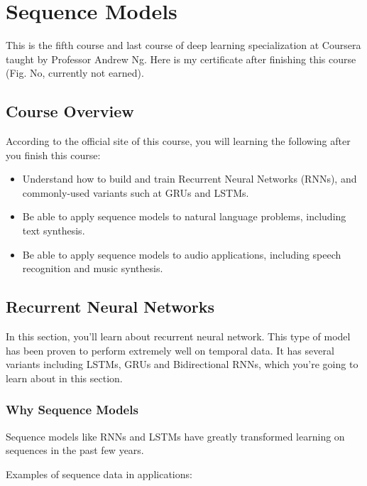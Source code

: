 \newpage
\section{Sequence Models}
This is the fifth course and last course of deep learning specialization at Coursera taught by Professor Andrew Ng. Here is my certificate after finishing this course (Fig. No, currently not earned).

\subsection{Course Overview}
According to the official site of this course, you will learning the following after you finish this course:

\begin{itemize}
    \item Understand how to build and train Recurrent Neural Networks (RNNs), and commonly-used variants such at GRUs and LSTMs.
    \item Be able to apply sequence models to natural language problems, including text synthesis.
    \item Be able to apply sequence models to audio applications, including speech recognition and music synthesis.
\end{itemize}

\subsection{Recurrent Neural Networks}
In this section, you'll learn about recurrent neural network. This type of model has been proven to perform extremely well on temporal data. It has several variants including LSTMs, GRUs and Bidirectional RNNs, which you're going to learn about in this section.

\subsubsection{Why Sequence Models}
Sequence models like RNNs and LSTMs have greatly transformed learning on sequences in the past few years.

Examples of sequence data in applications:

